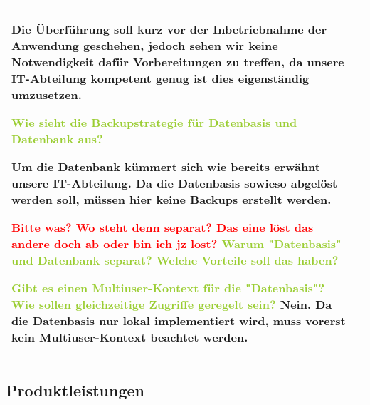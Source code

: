 \begin{center}
\begin{tabular}[ht] {l | p{13cm}}
        \textcolor{NavyBlue}{Die Überführung soll kurz vor der Inbetriebnahme der Anwendung geschehen, jedoch sehen wir keine Notwendigkeit dafür Vorbereitungen zu treffen, da unsere IT-Abteilung kompetent genug ist dies eigenständig umzusetzen.}

        \textcolor{YellowGreen}{Wie sieht die Backupstrategie für Datenbasis und Datenbank aus?}

        \textcolor{NavyBlue}{Um die Datenbank kümmert sich wie bereits erwähnt unsere IT-Abteilung. Da die Datenbasis sowieso abgelöst werden soll, müssen hier keine Backups erstellt werden.}

        \textcolor{Red}{Bitte was? Wo steht denn separat? Das eine löst das andere doch ab oder bin ich jz lost?}
        \textcolor{YellowGreen}{Warum "Datenbasis" und Datenbank separat? Welche Vorteile soll das haben?}

        \textcolor{YellowGreen}{Gibt es einen Multiuser-Kontext für die "Datenbasis"? Wie sollen gleichzeitige Zugriffe geregelt sein?}
        \textcolor{NavyBlue}{Nein. Da die Datenbasis nur lokal implementiert wird, muss vorerst kein Multiuser-Kontext beachtet werden.}
        \\
        \hline
        
    \end{tabular}
\end{center}

\subsection{Produktleistungen}

